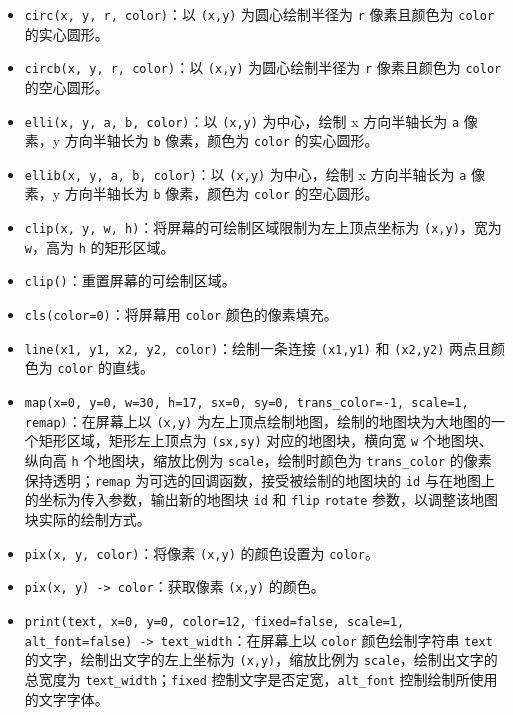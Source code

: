 \documentclass[UTF8]{ctexart}
\begin{document}
\begin{itemize}
    \item \texttt{circ(x, y, r, color)}：以 \texttt{(x,y)} 为圆心绘制半径为 \texttt{r} 像素且颜色为 \texttt{color} 的实心圆形。
    \item \texttt{circb(x, y, r, color)}：以 \texttt{(x,y)} 为圆心绘制半径为 \texttt{r} 像素且颜色为 \texttt{color} 的空心圆形。
    \item \texttt{elli(x, y, a, b, color)}：以 \texttt{(x,y)} 为中心，绘制 x 方向半轴长为 \texttt{a} 像素，y 方向半轴长为 \texttt{b} 像素，颜色为 \texttt{color} 的实心圆形。
    \item \texttt{ellib(x, y, a, b, color)}：以 \texttt{(x,y)} 为中心，绘制 x 方向半轴长为 \texttt{a} 像素，y 方向半轴长为 \texttt{b} 像素，颜色为 \texttt{color} 的空心圆形。
    \item \texttt{clip(x, y, w, h)}：将屏幕的可绘制区域限制为左上顶点坐标为 \texttt{(x,y)}，宽为 \texttt{w}，高为 \texttt{h} 的矩形区域。
    \item \texttt{clip()}：重置屏幕的可绘制区域。
    \item \texttt{cls(color=0)}：将屏幕用 \texttt{color} 颜色的像素填充。
    \item \texttt{line(x1, y1, x2, y2, color)}：绘制一条连接 \texttt{(x1,y1)} 和 \texttt{(x2,y2)} 两点且颜色为 \texttt{color} 的直线。
    \item \texttt{map(x=0, y=0, w=30, h=17, sx=0, sy=0, trans\_color=-1, scale=1, remap)}：在屏幕上以 \texttt{(x,y)} 为左上顶点绘制地图，绘制的地图块为大地图的一个矩形区域，矩形左上顶点为 \texttt{(sx,sy)} 对应的地图块，横向宽 \texttt{w} 个地图块、纵向高 \texttt{h} 个地图块，缩放比例为 \texttt{scale}，绘制时颜色为 \texttt{trans\_color} 的像素保持透明；\texttt{remap} 为可选的回调函数，接受被绘制的地图块的 \texttt{id} 与在地图上的坐标为传入参数，输出新的地图块 \texttt{id} 和 \texttt{flip} \texttt{rotate} 参数，以调整该地图块实际的绘制方式。
    \item \texttt{pix(x, y, color)}：将像素 \texttt{(x,y)} 的颜色设置为 \texttt{color}。
    \item \texttt{pix(x, y) -> color}：获取像素 \texttt{(x,y)} 的颜色。
    \item \texttt{print(text, x=0, y=0, color=12, fixed=false, scale=1, alt\_font=false) -> text\_width}：在屏幕上以 \texttt{color} 颜色绘制字符串 \texttt{text} 的文字，绘制出文字的左上坐标为 \texttt{(x,y)}，缩放比例为 \texttt{scale}，绘制出文字的总宽度为 \texttt{text\_width}；\texttt{fixed} 控制文字是否定宽，\texttt{alt\_font} 控制绘制所使用的文字字体。

\end{itemize}
\end{document}
